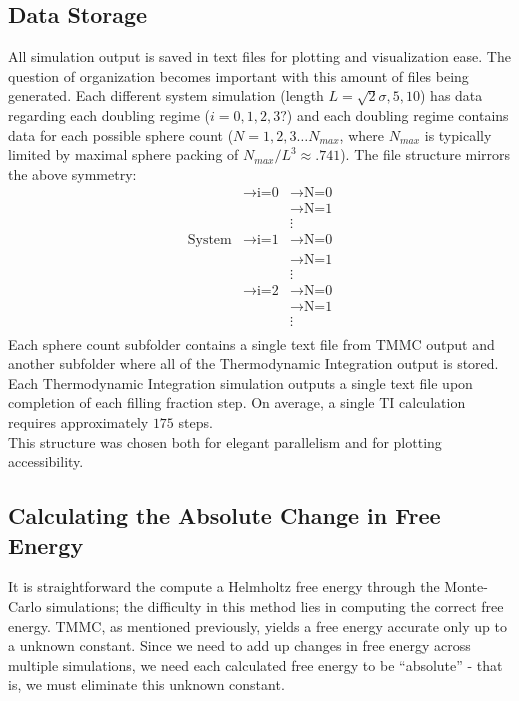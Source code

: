 \documentclass[12pt]{article}
\begin{document}
\subsection{Data Storage}
All simulation output is saved in text files for plotting and visualization ease. The question of organization becomes important with this amount of files being generated. Each different system simulation (length $L = \sqrt2 \sigma, 5,10$) has data regarding each doubling regime ($i=0,1,2,3?$) and each doubling regime contains data for each possible sphere count ($N=1,2,3\dots N_{max}$, where $N_{max}$ is typically limited by maximal sphere packing of $N_{max}/L^3\approx.741$). The file structure mirrors the above symmetry: 
\begin{align*}
                &\rightarrow \text{i=0} &\rightarrow \text{N=0}\\
                & &\rightarrow \text{N=1}\\
                && \vdots\\
\text{System} & \rightarrow \text{i=1} &\rightarrow \text{N=0}\\
                && \rightarrow \text{N=1}\\
                &&\vdots\\
                &\rightarrow \text{i=2} &\rightarrow \text{N=0}\\
                && \rightarrow \text{N=1}\\
                &&\vdots\\
\end{align*}
Each sphere count subfolder contains a single text file from TMMC output and another subfolder where all of the Thermodynamic Integration output is stored. Each Thermodynamic Integration simulation outputs a single text file upon completion of each filling fraction step. On average, a single TI calculation requires approximately $175$ steps. \\
This structure was chosen both for elegant parallelism and for plotting accessibility. 

\subsection{Calculating the Absolute Change in Free Energy}
It is straightforward the compute a Helmholtz free energy through the Monte-Carlo simulations; the difficulty in this method lies in computing the correct free energy. TMMC, as mentioned previously, yields a free energy accurate only up to a unknown constant. Since we need to add up changes in free energy across multiple simulations, we need each calculated free energy to be ``absolute'' - that is, we must eliminate this unknown constant. \\
\end{document}
